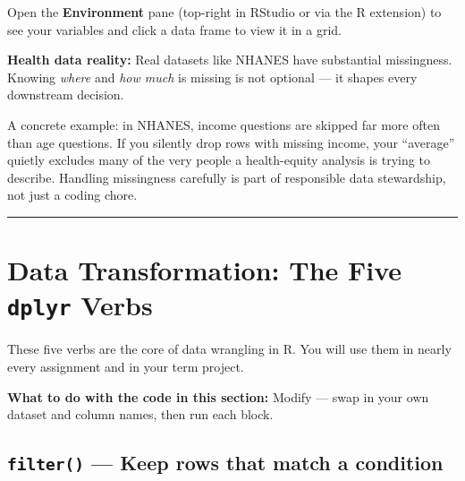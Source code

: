 \documentclass[
  letterpaper,
  DIV=11,
  numbers=noendperiod,
  oneside]{scrreprt}
\begin{document}
Open the \textbf{Environment} pane (top-right in RStudio or via the R
extension) to see your variables and click a data frame to view it in a
grid.

\begin{tcolorbox}[enhanced jigsaw, title=\textcolor{quarto-callout-warning-color}{\faExclamationTriangle}\hspace{0.5em}{Warning}, arc=.35mm, toptitle=1mm, colframe=quarto-callout-warning-color-frame, toprule=.15mm, leftrule=.75mm, bottomtitle=1mm, opacityback=0, bottomrule=.15mm, coltitle=black, breakable, opacitybacktitle=0.6, titlerule=0mm, colback=white, left=2mm, colbacktitle=quarto-callout-warning-color!10!white, rightrule=.15mm]

\textbf{Health data reality:} Real datasets like NHANES have substantial
missingness. Knowing \emph{where} and \emph{how much} is missing is not
optional --- it shapes every downstream decision.

A concrete example: in NHANES, income questions are skipped far more
often than age questions. If you silently drop rows with missing income,
your ``average'' quietly excludes many of the very people a
health-equity analysis is trying to describe. Handling missingness
carefully is part of responsible data stewardship, not just a coding
chore.

\end{tcolorbox}

\begin{center}\rule{0.5\linewidth}{0.5pt}\end{center}

\section*{\texorpdfstring{Data Transformation: The Five \texttt{dplyr}
Verbs
}{Data Transformation: The Five dplyr Verbs }}\label{data-transformation-the-five-dplyr-verbs}


These five verbs are the core of data wrangling in R. You will use them
in nearly every assignment and in your term project.

\textbf{What to do with the code in this section:} Modify --- swap in
your own dataset and column names, then run each block.

\subsection*{\texorpdfstring{\texttt{filter()} --- Keep rows that match
a
condition}{filter() --- Keep rows that match a condition}}\label{filter-keep-rows-that-match-a-condition}
\end{document}
